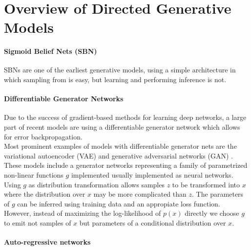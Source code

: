 \section{Overview of Directed Generative Models}
\label{sec:overview}

\paragraph{Sigmoid Belief Nets (SBN)}
\label{par:overview_sbn}
SBNs are one of the earliest generative models, using a simple architecture in which sampling from is easy, but learning and performing inference is not.

\paragraph{Differentiable Generator Networks}
Due to the success of gradient-based methods for learning deep networks, a large part of recent models are using a differentiable generator network which allows for error backpropagation.\\
Most prominent examples of models with differentiable generator nets are the variational autoencoder (VAE) \cite{vae:2014} and generative adversarial networks (GAN) \cite{gan:2014}.
These models include a generator networks representing a family of parametrized non-linear functions $g$ implemented usually implemented as neural networks.\\
Using $g$ as distribution transformation allows samples $z$ to be transformed into $x$ where the distribution over $x$ may be more complicated than $z$.
The parameters of $g$ can be inferred using training data and an appropiate loss function.\\
However, instead of maximizing the log-likelihood of $p(x)$ directly we choose $g$ to emit not samples of $x$ but parameters of a conditional distribution over $x$.

\paragraph{Auto-regressive networks}


